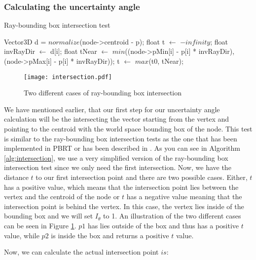 \subsubsection{Calculating the uncertainty angle}

\begin{algorithm}
	\caption{Ray-bounding box intersection test}
	\label{alg:intersection}
	\begin{algorithmic}[1] %
		\State Vector3D d = $normalize$(node->centroid - p);
		\State float t $\gets$ $-infinity$;
		\State float invRayDir $\gets$ d[i];
		\State float tNear $\gets$ $min$((node->pMin[i] - p[i] * invRayDir), (node->pMax[i] - p[i] * invRayDir));
		\State t $\gets$ $max$(t0, tNear);
		\EndFor
	\end{algorithmic}
\end{algorithm}

\begin{figure}
	\begin{center}
		\texttt{[image: intersection.pdf]}
		\caption{Two different cases of ray-bounding box intersection}
		\label{fig:intersection}
	\end{center}
\end{figure}


We have mentioned earlier, that our first step for our uncertainty angle calculation will be the intersecting the vector starting from the vertex and pointing to the centroid with the world space bounding box of the node. This test is similar to the ray-bounding box intersection tests as the one that has been implemented in PBRT or has been described in \Cite{RBI1,RBI2}. As you can see in Algorithm \ref{alg:intersection}, we use a very simplified version of the ray-bounding box intersection test since we only need the first intersection. Now, we have the distance $t$ to our first intersection point and there are two possible cases. Either, $t$ has a positive value, which means that the intersection point lies between the vertex and the centroid of the node or $t$ has a negative value meaning that the intersection point is behind the vertex. In this case, the vertex lies inside of the bounding box and we will set $I_\theta$ to 1. An illustration of the two different cases can be seen in Figure \ref{fig:intersection}. $p1$ has lies outside of the box and thus has a positive $t$ value, while $p2$ is inside the box and returns a positive $t$ value.

Now, we can calculate the actual intersection point $is$:

